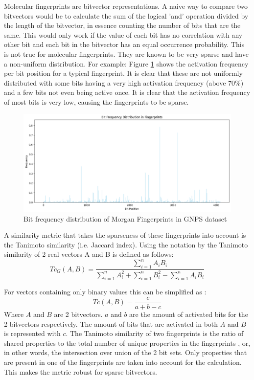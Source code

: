 Molecular fingerprints are bitvector representations. A naive way to compare two bitvectors would be to calculate the sum of the logical 'and' operation divided by the length of the bitvector, in essence counting the number of bits that are the same. This would only work if the value of each bit has no correlation with any other bit and each bit in the bitvector has an equal occurrence probability. This is not true for molecular fingerprints. They are known to be very sparse and have a non-uniform distribution. For example: Figure \ref{fig:bit_frequency_fingerprints} shows the activation frequency per bit position for a typical fingerprint. It is clear that these are not uniformly distributed with some bits having a very high activation frequency (above 70\%) and a few bits not even being active once. It is clear that the activation frequency of most bits is very low, causing the fingerprints to be sparse.

\begin{figure}[h]
    \centering
    \includegraphics[width=\linewidth]{figures/background/bit-frequency-distribution-fingerprints.png}
    \caption{Bit frequency distribution of Morgan Fingerprints in GNPS dataset}
    \label{fig:bit_frequency_fingerprints}
\end{figure}

A similarity metric that takes the sparseness of these fingerprints into account is the Tanimoto similarity (i.e. Jaccard index). Using the notation by \textcite{mathieson2017computer}  the Tanimoto similarity of 2 real vectors A and B is defined as follows:
\[Tc_G(A,B) = \frac{\sum\limits^n_{i=1}{A_iB_i}}{\sum\limits^n_{i=1}{A_i^2} + \sum\limits^n_{i=1}{B_i^2} - \sum\limits^n_{i=1}{A_iB_i}}\]

For vectors containing only binary values this can be simplified as \cite{mathieson2017computer}:
\[Tc(A, B)=\frac{c}{a + b - c}\]
Where $A$ and $B$ are 2 bitvectors. $a$ and $b$ are the amount of activated bits for the 2 bitvectors respectively. The amount of bits that are activated in both $A$ and $B$ is represented with $c$. The Tanimoto similarity of two fingerprints is the ratio of shared properties to the total number of unique properties in the fingerprints \cite{mathieson2017computer}, or, in other words, the intersection over union of the 2 bit sets. Only properties that are present in one of the fingerprints are taken into account for the calculation. This makes the metric robust for sparse bitvectors.

